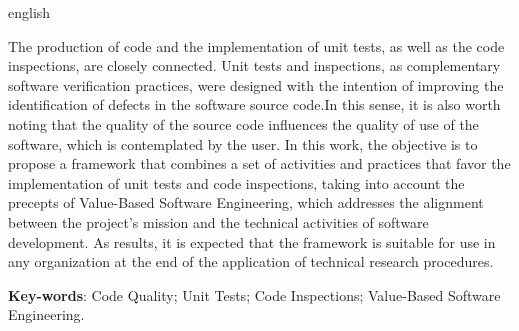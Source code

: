 \begin{resumo}[Abstract]
 \begin{otherlanguage*}{english}

   The production of code and the implementation of unit tests, as well as the code inspections, are closely connected. Unit tests and inspections, as complementary software verification practices, were designed with the intention of improving the identification of defects in the software source code.In this sense, it is also worth noting that the quality of the source code influences the quality of use of the software, which is contemplated by the user. In this work, the objective is to propose a framework that combines a set of activities and practices that favor the implementation of unit tests and code inspections, taking into account the precepts of Value-Based Software Engineering, which addresses the alignment between the project's mission and the technical activities of software development. As results, it is expected that the framework is suitable for use in any organization at the end of the application of technical research procedures.

   \vspace{\onelineskip}
 
   \noindent 
   \textbf{Key-words}: Code Quality; Unit Tests; Code Inspections; Value-Based Software Engineering.
 \end{otherlanguage*}
\end{resumo}
